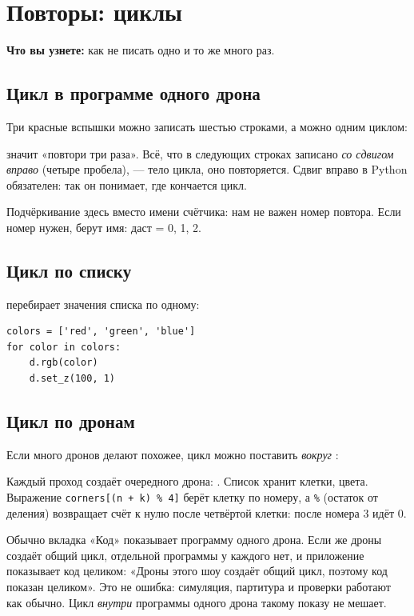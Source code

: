 \chapter{Повторы: циклы}\label{ch:cikly}

\textbf{Что вы узнете:} как не писать одно и то же много раз.

\section{Цикл в программе одного дрона}

Три красные вспышки можно записать шестью строками, а можно одним циклом:


 значит «повтори три раза». Всё, что в следующих строках записано \emph{со сдвигом вправо} (четыре пробела), — тело цикла, оно повторяется. Сдвиг вправо в Python обязателен: так он понимает, где кончается цикл.

Подчёркивание \kod{_} здесь вместо имени счётчика: нам не важен номер повтора. Если номер нужен, берут имя:  даст  = 0, 1, 2.

\section{Цикл по списку}

 перебирает значения списка по одному:

\begin{verbatim}
colors = ['red', 'green', 'blue']
for color in colors:
    d.rgb(color)
    d.set_z(100, 1)
\end{verbatim}

\section{Цикл по дронам}

Если много дронов делают похожее, цикл можно поставить \emph{вокруг} :


Каждый проход создаёт очередного дрона: . Список  хранит клетки,  цвета. Выражение \texttt{corners[(n + k) \% 4]} берёт клетку по номеру, а \texttt{\%} (остаток от деления) возвращает счёт к нулю после четвёртой клетки: после номера 3 идёт 0.

\begin{vnimanie}
Обычно вкладка «Код» показывает программу одного дрона. Если же дроны создаёт общий цикл, отдельной программы у каждого нет, и приложение показывает код целиком: «Дроны этого шоу создаёт общий цикл, поэтому код показан целиком». Это не ошибка: симуляция, партитура и проверки работают как обычно. Цикл \emph{внутри} программы одного дрона такому показу не мешает.
\end{vnimanie}

